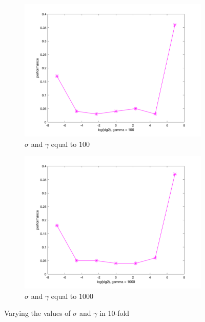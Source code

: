 \documentclass[a4paper, 11pt, one column]{article}
\begin{document}
\begin{figure}[]
\begin{subfigure}{0.33\linewidth}
            \includegraphics[width=\linewidth]{images/10f_sig2_g_100.png}
            \caption{$\sigma$ and $\gamma$ equal to $100$}
        \end{subfigure}
        \begin{subfigure}{0.33\linewidth}
            \includegraphics[width=\linewidth]{images/10f_sig2_g_1000.png}
            \caption{$\sigma$ and $\gamma$ equal to $1000$}
        \end{subfigure}
        \caption{Varying the values of $\sigma$ and $\gamma$ in 10-fold}
        \label{fig:kfoldval}
\end{figure}
\end{document}
